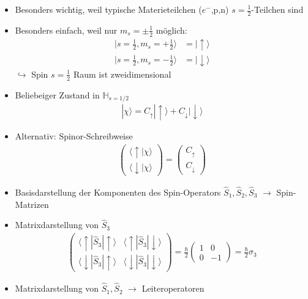 \documentclass[10pt,article,colorback,accentcolor=tud9d]{scrartcl}
\begin{document}
\begin{itemize}
	\item Besonders wichtig, weil typische Materieteilchen ($e^-$,p,n) $s=\frac{1}{2}$-Teilchen sind
  \item Besonders einfach, weil nur $m_s=\pm\frac{1}{2}$ möglich:
    \begin{align}
    |s=\frac{1}{2},m_s=+\frac{1}{2}\rangle&=|\uparrow\rangle\\
    |s=\frac{1}{2},m_s=-\frac{1}{2}\rangle&=|\downarrow\rangle
    \end{align}
    $\hookrightarrow$ Spin $s=\frac{1}{2}$ Raum ist zweidimensional
  \item Beliebeiger Zustand in $\mathbb{H}_{s=1/2}$
    \begin{align}
    |\chi\rangle=C_\uparrow|\uparrow\rangle+C_\downarrow|\downarrow\rangle
    \end{align}
  \item Alternativ: Spinor-Schreibweise
    \begin{align}
    \left(\begin{array}{c} \langle\uparrow|\chi\rangle \\ \langle\downarrow|\chi\rangle \end{array}\right)=
    \left(\begin{array}{c} C_\uparrow \\ C_\downarrow \end{array}\right)
    \end{align}
  \item Basisdarstellung der Komponenten des Spin-Operators $\hat{S}_1,\hat{S}_2,\hat{S}_3$
    $\rightarrow$ Spin-Matrizen
  \item Matrixdarstellung von $\hat{S}_3$
    \begin{align}
     \left(\begin{matrix}
    \langle\uparrow|\hat{S}_3|\uparrow\rangle & \langle\uparrow|\hat{S}_3|\downarrow\rangle \\ 
     \langle\downarrow|\hat{S}_3|\uparrow\rangle &  \langle\downarrow|\hat{S}_3|\downarrow\rangle 
    \end{matrix}\right)=
    \frac{\hbar}{2}\left(\begin{matrix}
    1 & 0\\ 
    0 &  -1
    \end{matrix}\right)=
    \frac{\hbar}{2}\sigma_3
    \end{align}
  \item Matrixdarstellung von $\hat{S}_1,\hat{S}_2$ $\rightarrow$ Leiteroperatoren

\end{itemize}
\end{document}
